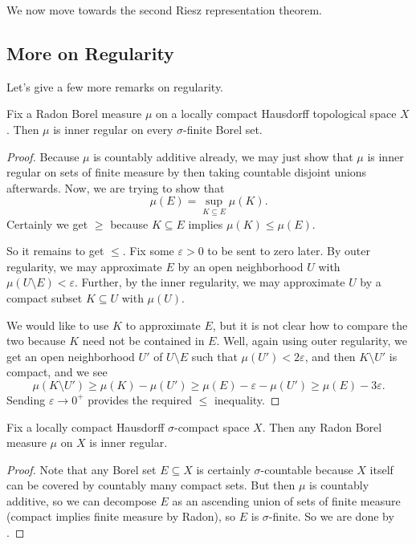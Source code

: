 \documentclass[../notes.tex]{subfiles}
\begin{document}
We now move towards the second Riesz representation theorem.

\subsection{More on Regularity}
Let's give a few more remarks on regularity.
\begin{proposition} \label{prop:radon-inner-reg-on-sigma-finite}
	Fix a Radon Borel measure $\mu$ on a locally compact Hausdorff topological space $X$. Then $\mu$ is inner regular on every $\sigma$-finite Borel set.
\end{proposition}
\begin{proof}
	Because $\mu$ is countably additive already, we may just show that $\mu$ is inner regular on sets of finite measure by then taking countable disjoint unions afterwards. Now, we are trying to show that
	\[\mu(E)=\sup_{K\subseteq E}\mu(K).\]
	Certainly we get $\ge$ because $K\subseteq E$ implies $\mu(K)\le\mu(E)$.
	
	So it remains to get $\le$. Fix some $\varepsilon>0$ to be sent to zero later. By outer regularity, we may approximate $E$ by an open neighborhood $U$ with $\mu(U\setminus E)<\varepsilon$. Further, by the inner regularity, we may approximate $U$ by a compact subset $K\subseteq U$ with $\mu(U)$.
	
	We would like to use $K$ to approximate $E$, but it is not clear how to compare the two because $K$ need not be contained in $E$. Well, again using outer regularity, we get an open neighborhood $U'$ of $U\setminus E$ such that $\mu(U')<2\varepsilon$, and then $K\setminus U'$ is compact, and we see
	\[\mu(K\setminus U')\ge\mu(K)-\mu(U')\ge\mu(E)-\varepsilon-\mu(U')\ge\mu(E)-3\varepsilon.\]
	Sending $\varepsilon\to0^+$ provides the required $\le$ inequality.
\end{proof}
\begin{corollary}
	Fix a locally compact Hausdorff $\sigma$-compact space $X$. Then any Radon Borel measure $\mu$ on $X$ is inner regular.
\end{corollary}
\begin{proof}
	Note that any Borel set $E\subseteq X$ is certainly $\sigma$-countable because $X$ itself can be covered by countably many compact sets. But then $\mu$ is countably additive, so we can decompose $E$ as an ascending union of sets of finite measure (compact implies finite measure by Radon), so $E$ is $\sigma$-finite. So we are done by .
\end{proof}
\end{document}
